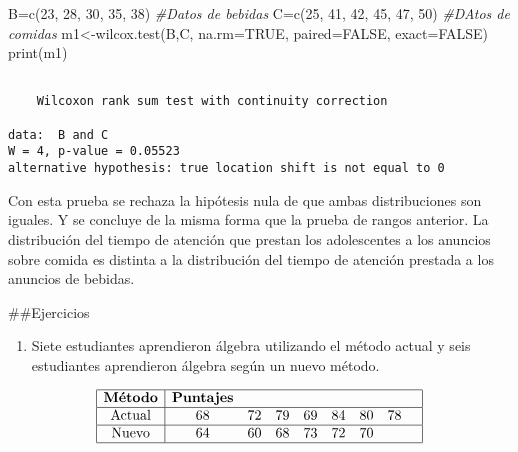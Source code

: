 \documentclass[
  a4paper,
  oneside,
  openany]{book}
\newenvironment{Shaded}{\begin{snugshade}}{\end{snugshade}}
\newcommand{\AttributeTok}[1]{\textcolor[rgb]{0.77,0.63,0.00}{#1}}
\newcommand{\CommentTok}[1]{\textcolor[rgb]{0.56,0.35,0.01}{\textit{#1}}}
\newcommand{\ConstantTok}[1]{\textcolor[rgb]{0.00,0.00,0.00}{#1}}
\newcommand{\DecValTok}[1]{\textcolor[rgb]{0.00,0.00,0.81}{#1}}
\newcommand{\FunctionTok}[1]{\textcolor[rgb]{0.00,0.00,0.00}{#1}}
\newcommand{\NormalTok}[1]{#1}
\newcommand{\OtherTok}[1]{\textcolor[rgb]{0.56,0.35,0.01}{#1}}
\providecommand{\tightlist}{%
  \setlength{\itemsep}{0pt}\setlength{\parskip}{0pt}}
\begin{document}
\begin{Shaded}
\begin{Highlighting}[]
\NormalTok{B}\OtherTok{=}\FunctionTok{c}\NormalTok{(}\DecValTok{23}\NormalTok{, }\DecValTok{28}\NormalTok{, }\DecValTok{30}\NormalTok{, }\DecValTok{35}\NormalTok{, }\DecValTok{38}\NormalTok{)     }\CommentTok{\#Datos de bebidas}
\NormalTok{C}\OtherTok{=}\FunctionTok{c}\NormalTok{(}\DecValTok{25}\NormalTok{, }\DecValTok{41}\NormalTok{, }\DecValTok{42}\NormalTok{, }\DecValTok{45}\NormalTok{, }\DecValTok{47}\NormalTok{, }\DecValTok{50}\NormalTok{) }\CommentTok{\#DAtos de comidas}
\NormalTok{m1}\OtherTok{\textless{}{-}}\FunctionTok{wilcox.test}\NormalTok{(B,C, }\AttributeTok{na.rm=}\ConstantTok{TRUE}\NormalTok{, }\AttributeTok{paired=}\ConstantTok{FALSE}\NormalTok{, }\AttributeTok{exact=}\ConstantTok{FALSE}\NormalTok{)}
\FunctionTok{print}\NormalTok{(m1)}
\end{Highlighting}
\end{Shaded}

\begin{verbatim}

    Wilcoxon rank sum test with continuity correction

data:  B and C
W = 4, p-value = 0.05523
alternative hypothesis: true location shift is not equal to 0
\end{verbatim}

Con esta prueba se rechaza la hipótesis nula de que ambas distribuciones son iguales. Y se concluye de la misma forma que la prueba de rangos anterior. La distribución del tiempo de atención que prestan los adolescentes a los anuncios sobre comida es distinta a la distribución del tiempo de atención prestada a los anuncios de bebidas.

\#\#Ejercicios

\begin{enumerate}
\def\labelenumi{\arabic{enumi}.}
\tightlist
\item
  Siete estudiantes aprendieron álgebra utilizando el método actual y seis estudiantes aprendieron álgebra según un nuevo método.
\end{enumerate}

\[
\begin{array}{|c| c c c c c c c c|} 
\hline 
\textbf{Método} &\textbf{Puntajes} &&&&& & & \\ 
 \hline
\mbox{Actual} & 68 & 72 & 79 & 69 & 84 & 80 & 78 &\\ 
 \hline
\mbox{Nuevo} & 64 & 60 & 68 & 73 & 72 & 70& & \\ 
\hline
\end{array}
\]
\end{document}
